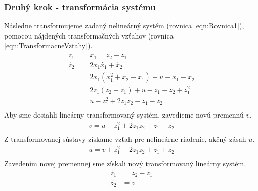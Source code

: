 \documentclass[../main.tex]{subfiles}
\begin{document}
\subsubsection{Druhý krok - transformácia systému}
Následne transformujeme zadaný nelineárný systém (rovnica \ref{eqn:Rovnica1}), pomocou nájdených transformačných vzťahov (rovnica \ref{eqn:TransformacneVztahy}).
\begin{equation}
	\begin{aligned}
	\dot{z_1} &= \dot{x_1} = z_2 - z_1 \\
	\dot{z_2} &= 2x_1\dot{x_1} + \dot{x_2} \\
	          & = 2x_1(x_1^2 + x_2 - x_1) + u - x_1 - x_2 \\
	          & = 2z_1(z_2 - z_1) + u - z_1 - z_2 + z_1^2\\
	          & = u - z_1^2 + 2z_1z_2 - z_1 - z_2 \\
	\end{aligned}
	\label{eqn:TransformovanySystem}
\end{equation}
Aby sme dosiahli lineárny transformovaný systém, zavedieme novú premennú $v$.
\begin{equation}
	\begin{split}
	 v = u - z_1^2 + 2z_1z_2 - z_1 - z_2 \\
	\end{split}
	\label{eqn:SubsV}
\end{equation}
Z transformovanej sústavy získame vzťah pre nelineárne riadenie, akčný zásah $u$.
\begin{equation}
	\begin{gathered}
		u = v + z_1^2 - 2z_1z_2 + z_1 + z_2\\
	\end{gathered}
	\label{eqn:Noveu}
\end{equation}
Zavedením novej premennej sme získali nový transformovaný lineárny systém.
\begin{equation}
	\begin{aligned}
	\dot{z_1}  &= z_2 - z_1 \\
	 \dot{z_2} &= v \\
	\end{aligned}
	\label{eqn:TransformovanySystem}
\end{equation}
\end{document}
